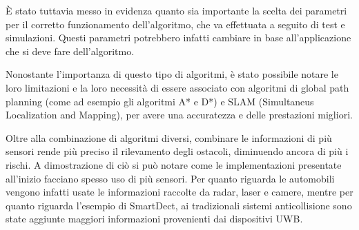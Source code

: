 \documentclass[Lau, binding=0.6cm, oneside]{sapthesis}
\begin{document}
È stato tuttavia messo in evidenza quanto sia importante la scelta dei parametri per il corretto funzionamento dell'algoritmo, che va effettuata a seguito di test e simulazioni.
Questi parametri potrebbero infatti cambiare in base all'applicazione che si deve fare dell'algoritmo.

Nonostante l'importanza di questo tipo di algoritmi, è stato possibile notare le loro limitazioni e la loro necessità di essere associato con algoritmi di global path planning (come ad esempio gli algoritmi A* e D*) e SLAM (Simultaneus Localization and Mapping), per avere una accuratezza e delle prestazioni migliori.

Oltre alla combinazione di algoritmi diversi, combinare le informazioni di più sensori rende più preciso il rilevamento degli ostacoli, diminuendo ancora di più i rischi.
A dimostrazione di ciò si può notare come le implementazioni presentate all'inizio facciano spesso uso di più sensori.
Per quanto riguarda le automobili vengono infatti usate le informazioni raccolte da radar, laser e camere, mentre per quanto riguarda l'esempio di SmartDect, ai tradizionali sistemi anticollisione sono state aggiunte maggiori informazioni provenienti dai dispositivi UWB.



\end{document}
